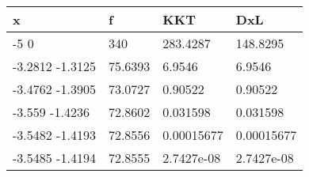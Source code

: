 \begin{tabular}{llll}
x & f & KKT & DxL \\ 
\hline 
-5  0 & 340 & 283.4287 & 148.8295 \\ 
-3.2812     -1.3125 & 75.6393 & 6.9546 & 6.9546 \\ 
-3.4762     -1.3905 & 73.0727 & 0.90522 & 0.90522 \\ 
-3.559     -1.4236 & 72.8602 & 0.031598 & 0.031598 \\ 
-3.5482     -1.4193 & 72.8556 & 0.00015677 & 0.00015677 \\ 
-3.5485     -1.4194 & 72.8555 & 2.7427e-08 & 2.7427e-08 \\ 
\hline 
\end{tabular}